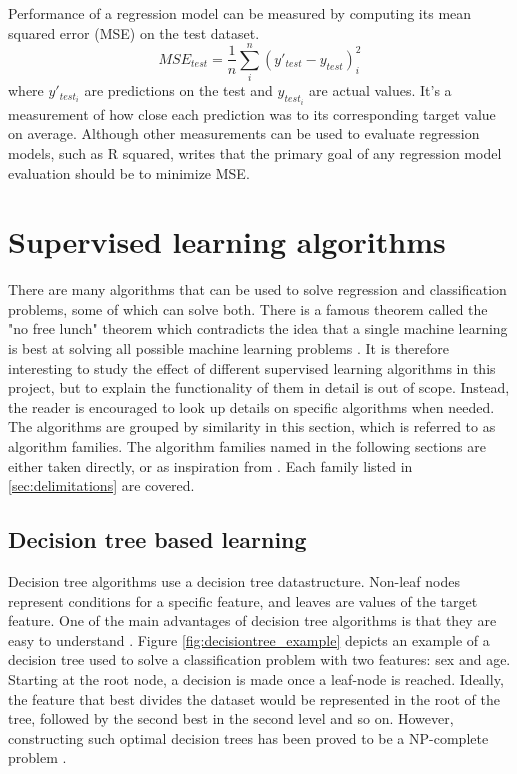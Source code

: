 	Performance of a regression model can be measured by computing its mean squared error (MSE) on the test dataset. 
\begin{equation}
	MSE_{test} = \frac{1}{n} \sum_{i}^{n}(y'_{test} - y_{test})_{i}^2
\end{equation}
where $y'_{test_i}$ are predictions on the test and $y_{test_i}$ are actual values. It's a measurement of how close each prediction was to its corresponding target value on average. Although other measurements can be used to evaluate regression models, such as R squared, \cite{BOOK:13} writes that the primary goal of any regression model evaluation should be to minimize MSE.

	
\section{Supervised learning algorithms} \label{sec:supervised_algorithms}
	There are many algorithms that can be used to solve regression and classification problems, some of which can solve both. There is a famous theorem called the "no free lunch" theorem which contradicts the idea that a single machine learning is best at solving all possible machine learning problems \cite{ARTICLE:5}.  It is therefore interesting to study the effect of different supervised learning algorithms in this project, but to explain the functionality of them in detail is out of scope. Instead, the reader is encouraged to look up details on specific algorithms when needed. The algorithms are grouped by similarity in this section, which is referred to as algorithm families. The algorithm families named in the following sections are either taken directly, or as inspiration from \cite{BOOK:6}. Each family listed in \ref{sec:delimitations} are covered. 

	\subsection{Decision tree based learning} \label{sec:tree_learning}
		Decision tree algorithms use a decision tree datastructure. Non-leaf nodes represent conditions for a specific feature, and leaves are values of the target feature. One of the main advantages of decision tree algorithms is that they are easy to understand \cite{ARTICLE:7}. Figure \ref{fig:decisiontree_example} depicts an example of a decision tree used to solve a classification problem with two features: sex and age. Starting at the root node, a decision is made once a leaf-node is reached. Ideally, the feature that best divides the dataset would be represented in the root of the tree, followed by the second best in the second level and so on. However, constructing such optimal decision trees has been proved to be a NP-complete problem \cite{ARTICLE:11}. 

